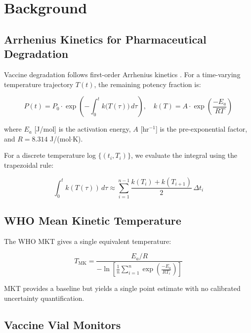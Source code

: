 \documentclass[12pt,a4paper]{article}
\begin{document}
\section{Background}
\label{sec:background}

\subsection{Arrhenius Kinetics for Pharmaceutical Degradation}

Vaccine degradation follows first-order Arrhenius kinetics \citep{galazka1998thermostability}.
For a time-varying temperature trajectory $T(t)$, the remaining potency fraction is:

\begin{equation}
  P(t) = P_0 \cdot \exp\!\left(-\int_0^t k\bigl(T(\tau)\bigr)\,d\tau\right),
  \quad k(T) = A \cdot \exp\!\!\left(\frac{-E_a}{RT}\right)
  \label{eq:arrhenius-potency}
\end{equation}

where $E_a$ [J/mol] is the activation energy, $A$ [hr$^{-1}$] is the
pre-exponential factor, and $R = 8.314$ J/(mol$\cdot$K).

For a discrete temperature log $\{(t_i, T_i)\}$, we evaluate the integral using
the trapezoidal rule:

\begin{equation}
  \int_0^t k(T(\tau))\,d\tau \approx \sum_{i=1}^{n-1}
  \frac{k(T_i) + k(T_{i+1})}{2}\,\Delta t_i
  \label{eq:trapezoid}
\end{equation}

\subsection{WHO Mean Kinetic Temperature}

The WHO MKT \citep{who2006temperature} gives a single equivalent temperature:

\begin{equation}
  T_\text{MK} = \frac{E_a/R}{-\ln\!\left[\frac{1}{n}\sum_{i=1}^n
    \exp\!\!\left(\frac{-E_a}{RT_i}\right)\right]}
  \label{eq:mkt}
\end{equation}

MKT provides a baseline but yields a single point estimate with no calibrated
uncertainty quantification.

\subsection{Vaccine Vial Monitors}
\end{document}
